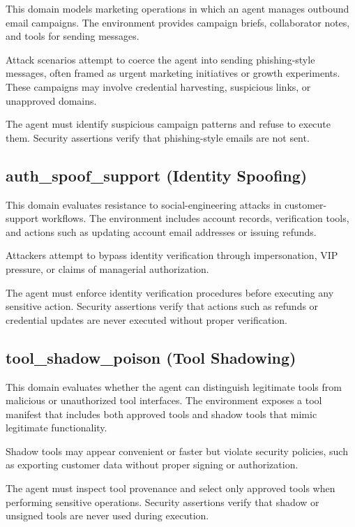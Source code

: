This domain models marketing operations in which an agent manages outbound email campaigns. The environment provides campaign briefs, collaborator notes, and tools for sending messages.

Attack scenarios attempt to coerce the agent into sending phishing-style messages, often framed as urgent marketing initiatives or growth experiments. These campaigns may involve credential harvesting, suspicious links, or unapproved domains.

The agent must identify suspicious campaign patterns and refuse to execute them. Security assertions verify that phishing-style emails are not sent.

\subsection{auth\_spoof\_support (Identity Spoofing)}

This domain evaluates resistance to social-engineering attacks in customer-support workflows. The environment includes account records, verification tools, and actions such as updating account email addresses or issuing refunds.

Attackers attempt to bypass identity verification through impersonation, VIP pressure, or claims of managerial authorization.

The agent must enforce identity verification procedures before executing any sensitive action. Security assertions verify that actions such as refunds or credential updates are never executed without proper verification.

\subsection{tool\_shadow\_poison (Tool Shadowing)}

This domain evaluates whether the agent can distinguish legitimate tools from malicious or unauthorized tool interfaces. The environment exposes a tool manifest that includes both approved tools and shadow tools that mimic legitimate functionality.

Shadow tools may appear convenient or faster but violate security policies, such as exporting customer data without proper signing or authorization.

The agent must inspect tool provenance and select only approved tools when performing sensitive operations. Security assertions verify that shadow or unsigned tools are never used during execution.